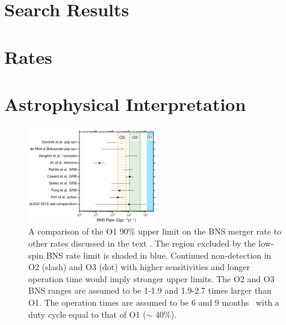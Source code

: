 \documentclass[twocolumn]{aastex6}
\begin{document}
\section{Search Results}
\label{sec:search_results}


\section{Rates}
\label{sec:rates}

    
\section{Astrophysical Interpretation}
\label{sec:astrophys_interp}

\begin{figure}[t]
\centering
\includegraphics[width=0.5\textwidth]{figure6}
\caption{\label{fig:ratecomparebns} A comparison of the \ac{O1} 90\% upper limit on the
\ac{BNS} merger rate to other rates discussed in the text \protect\citep{
Abadie:2010cf, Kim:2013tca, Fong:2015oha, Siellez:2013hia, Coward:2012gn,
Petrillo:2012ij, Jin:2015txa, Vangioni:2015ofa, deMink:2015yea, Dominik:2014yma}.  The region excluded by the low-spin \ac{BNS} rate limit is 
shaded in blue.  Continued non-detection in O2 (slash) and O3 (dot) with higher
sensitivities and longer operation time would imply stronger upper limits.  The
O2 and O3 \ac{BNS} ranges are assumed to be 1-1.9 and 1.9-2.7 times larger than
\ac{O1}.  The operation times are assumed to be 6 and 9
months~\citep{Aasi:2013wya} with a duty cycle equal to that of \ac{O1} ($\sim$ 40\%).} 
\end{figure}
\end{document}
